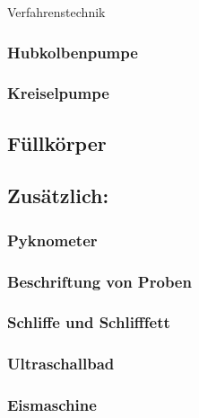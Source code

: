 Verfahrenstechnik
\subsubsection*{Hubkolbenpumpe}
\subsubsection*{Kreiselpumpe}



\subsection{Füllkörper}

\subsection{Zusätzlich:}
\subsubsection*{Pyknometer}
\subsubsection*{Beschriftung von Proben}

\subsubsection*{Schliffe und Schlifffett}
\label{sec:normschliff}
\subsubsection*{Ultraschallbad}
\subsubsection*{Eismaschine}
